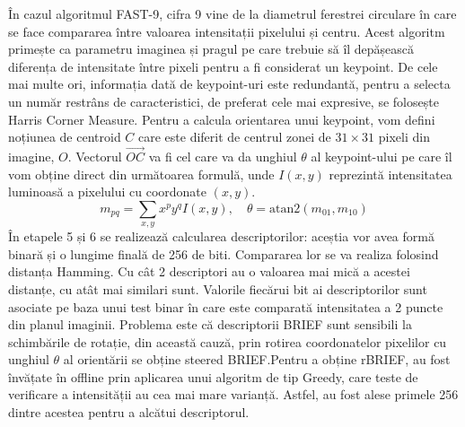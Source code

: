\documentclass[12pt,a4paper]{report}
\begin{document}
În cazul algoritmul FAST-9, 
cifra 9 vine de la diametrul ferestrei circulare în care se face compararea între valoarea 
intensitații pixelului și centru. Acest algoritm primește ca parametru imaginea și pragul 
pe care trebuie să îl depășească diferența de intensitate între pixeli pentru a fi considerat
un keypoint. De cele mai multe ori, informația dată de keypoint-uri este redundantă, pentru
a selecta un număr restrâns de caracteristici, de preferat cele mai expresive, se folosește Harris
Corner Measure. Pentru a calcula orientarea unui keypoint, vom defini noțiunea de centroid  $ C $ 
care este diferit de centrul zonei de $ 31 \times 31 $ pixeli din imagine, $ O $. Vectorul $ \vec{OC} $ va fi cel 
care va da unghiul $ \theta $ al keypoint-ului pe care îl vom obține direct din următoarea 
formulă, unde $ I(x, y) $ reprezintă intensitatea luminoasă a pixelului cu coordonate $ (x, y) $.      
\begin{equation}
m_{pq} = \sum_{x, y} x^p y^q I(x, y), \quad{}
\theta = \text{atan2}(m_{01}, m_{10})
\end{equation}
În etapele 5 și 6 se realizează calcularea descriptorilor: aceștia vor avea formă binară și o 
lungime finală de 256 de biti. Compararea lor se va realiza folosind distanța Hamming. Cu cât 
2 descriptori au o valoarea mai mică a acestei distanțe, cu atât mai similari sunt. Valorile 
fiecărui bit ai descriptorilor sunt asociate pe baza unui test binar în care este comparată intensitatea a 2 
puncte din planul imaginii. Problema este că descriptorii BRIEF sunt sensibili la schimbările de
rotație, din această cauză, prin rotirea coordonatelor pixelilor cu unghiul $ \theta $ al 
orientării se obține steered BRIEF.\@ Pentru a obține rBRIEF, au fost învățate în offline prin
aplicarea unui algoritm de tip Greedy, care teste de verificare a intensității au cea mai mare 
varianță. Astfel, au fost alese primele 256 dintre acestea pentru a alcătui descriptorul.       
\end{document}
